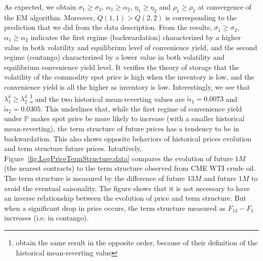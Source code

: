 As expected, we obtain $\sigma_1 \geq \sigma_2$, $\alpha_1 \geq \alpha_2$, $\eta_1 \geq \eta_2$ and $\rho_1 \geq \rho_2$ at convergence of the EM algorithm. Moreover, $Q(1,1) > Q(2,2)$ is corresponding to the prediction that we did from the data description. From the results, $\sigma_1 \geq \sigma_2$, $\alpha_1 \geq \alpha_2$ indicates the first regime (backwardation) characterized by a higher value in both volatility and equilibrium level of convenience yield, and the second regime (contango) characterized by a lower value in both volatility and equilibrium convenience yield level. It verifies the theory of storage that the volatility of the commodity spot price is high when the inventory is low, and the convenience yield is all the higher as inventory is low.
Interestingly, we see that $\lambda^{\delta}_1 \geq \lambda^{\delta}_2$ \footnote{\cite{almansour:2016} obtain the same result in the opposite order, because of their definition of the historical mean-reverting value} and the two historical mean-reverting values are $\widetilde{\alpha}_1 = 0.0073$ and $\widetilde{\alpha}_2 = 0.0305$. This underlines that, while the first regime of convenience yield under $\mathbb{P}$ makes spot price be more likely to increase (with a smaller historical mean-reverting), the term structure of future prices has a tendency to be in backwardation.
	This also shows opposite behaviors of historical prices evolution and term structure future prices. Intuitively, Figure~\ref{fig:LogPriceTermStructure:data} compares the evolution of future $1M$ (the nearest contracts) to the term structure observed from CME WTI crude oil. The term structure is measured by the difference of future $13M$ and future $1M$ to avoid the eventual saisonality. The figure shows that it is not necessary to have an inverse relationship between the evolution of price and term structure. But when a significant drop in price occurs, the term structure measured as $F_{13} - F_1$ increases (i.e. in contango).
